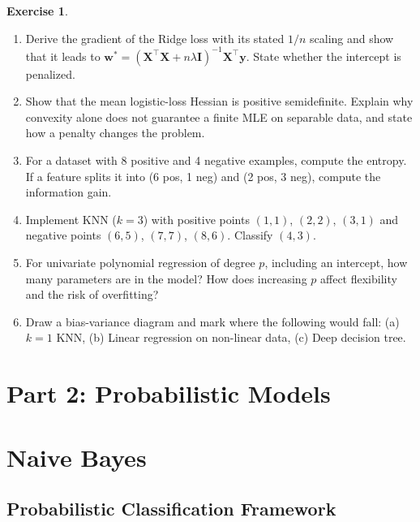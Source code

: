 \documentclass[11pt,twoside]{article}
\numberwithin{equation}{section}
\newcommand{\vect}[1]{\bm{#1}}
\newcommand{\mat}[1]{\bm{#1}}
\theoremstyle{plain}
\theoremstyle{definition}
\newtheorem{exercise}[theorem]{Exercise}
\theoremstyle{remark}
\begin{document}
\begin{exercise}
\begin{enumerate}
\item Derive the gradient of the Ridge loss with its stated $1/n$ scaling and show that it leads to $\vect{w}^* = (\mat{X}^\top\mat{X} + n\lambda\mat{I})^{-1}\mat{X}^\top\vect{y}$. State whether the intercept is penalized.

\item Show that the mean logistic-loss Hessian is positive semidefinite. Explain why convexity alone does not guarantee a finite MLE on separable data, and state how a penalty changes the problem.

\item For a dataset with 8 positive and 4 negative examples, compute the entropy. If a feature splits it into (6 pos, 1 neg) and (2 pos, 3 neg), compute the information gain.

\item Implement KNN ($k=3$) with positive points $(1,1)$, $(2,2)$, $(3,1)$ and negative points $(6,5)$, $(7,7)$, $(8,6)$. Classify $(4,3)$.

\item For univariate polynomial regression of degree $p$, including an intercept, how many parameters are in the model? How does increasing $p$ affect flexibility and the risk of overfitting?

\item Draw a bias-variance diagram and mark where the following would fall: (a) $k=1$ KNN, (b) Linear regression on non-linear data, (c) Deep decision tree.
\end{enumerate}
\end{exercise}

\section*{Part 2: Probabilistic Models}

\section{Naive Bayes}
\label{sec:naive-bayes}

\subsection{Probabilistic Classification Framework}
\end{document}
